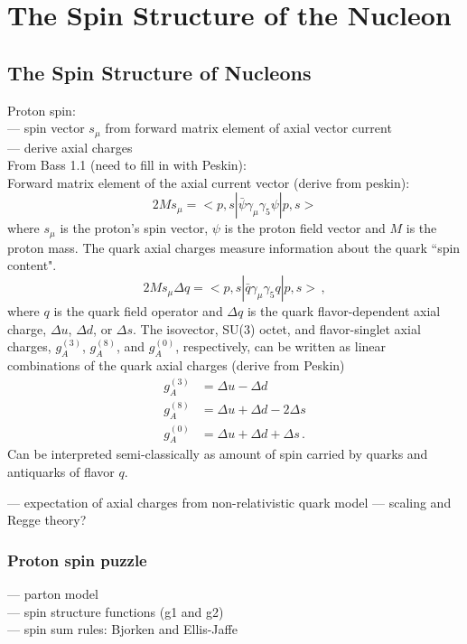 \section{The Spin Structure of the Nucleon} \label{sec:nuctheory}
\hspace{\parindent}

\subsection{The Spin Structure of Nucleons} \label{sec:nuctheory}
  Proton spin: \\
  --- spin vector $s_{\mu}$ from forward matrix element of axial vector current \\
  --- derive axial charges \\
  From Bass 1.1 (need to fill in with Peskin): \\
  Forward matrix element of the axial current vector (derive from peskin):
  \[
      2Ms_{\mu} = <p,s|\bar{\psi}\gamma_{\mu} \gamma_{5} \psi|p,s>
  \]
  where $s_{\mu}$ is the proton's spin vector, $\psi$ is the proton field
  vector and $M$ is the proton mass. The quark axial charges measure
  information about the quark ``spin content".
  \[
    2Ms_{\mu}\Delta q = <p,s| \bar{q}\gamma_{\mu}\gamma_{5}q|p,s> \,,
  \]
  where $q$ is the quark field operator and $\Delta q$ is the quark
  flavor-dependent axial charge, $\Delta u$, $\Delta d$, or $\Delta s$. The
  isovector, SU(3) octet, and flavor-singlet axial charges, $g_A^{(3)}$,
  $g_A^{(8)}$, and $g_A^{(0)}$, respectively, can be written as linear
  combinations of the quark axial charges (derive from Peskin)
  \begin{align}
      g_A^{(3)} &= \Delta u - \Delta d \\
      g_A^{(8)} &= \Delta u + \Delta d - 2\Delta s \\
      g_A^{(0)} &= \Delta u + \Delta d + \Delta s \,.
  \end{align}
  Can be interpreted semi-classically as amount of spin carried by quarks and
  antiquarks of flavor $q$.


  --- expectation of axial charges from non-relativistic quark model
  --- scaling and Regge theory?
  \subsubsection{Proton spin puzzle}
    --- parton model \\
    --- spin structure functions (g1 and g2) \\
    --- spin sum rules: Bjorken and Ellis-Jaffe \\
